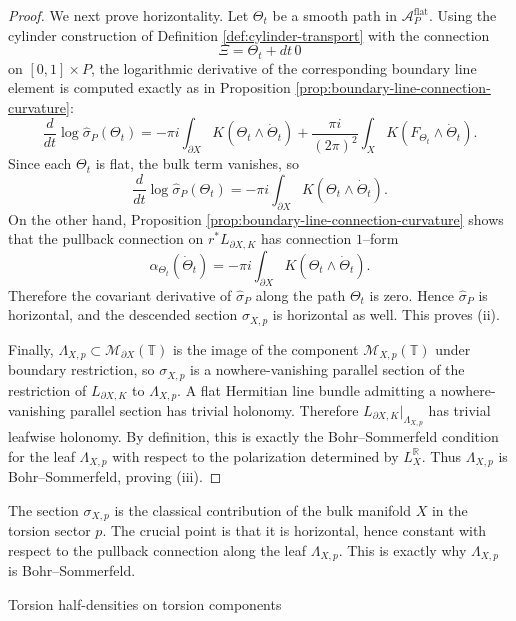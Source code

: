 \documentclass[12pt]{amsart}
\makeatletter
\renewcommand\subsection{\@startsection{subsection}{2}%
  \z@{.5\linespacing\@plus.7\linespacing}{-.5em}%
  {\normalfont\bfseries}}
\numberwithin{equation}{section}
\makeatother
\begin{document}
\begin{proof}
We next prove horizontality. Let $\Theta_t$ be a smooth path in
$\mathcal A^{\mathrm{flat}}_P$. Using the cylinder construction of Definition \ref{def:cylinder-transport} with the
connection
\[
\Xi=\Theta_t+dt\,0
\]
on $[0,1]\times P$, the logarithmic derivative of the corresponding boundary line element is
computed exactly as in Proposition \ref{prop:boundary-line-connection-curvature}:
\[
\frac{d}{dt}\log \widehat{\sigma}_P(\Theta_t)
=
-\pi i\int_{\partial X} K(\Theta_t\wedge \dot\Theta_t)
+\frac{\pi i}{(2\pi)^2}\int_X K(F_{\Theta_t}\wedge \dot\Theta_t).
\]
Since each $\Theta_t$ is flat, the bulk term vanishes, so
\[
\frac{d}{dt}\log \widehat{\sigma}_P(\Theta_t)
=
-\pi i\int_{\partial X} K(\Theta_t\wedge \dot\Theta_t).
\]
On the other hand, Proposition \ref{prop:boundary-line-connection-curvature} shows that the pullback connection on
$r^*L_{\partial X,K}$ has connection $1$--form
\[
\alpha_{\Theta_t}(\dot\Theta_t)
=
-\pi i\int_{\partial X} K(\Theta_t\wedge \dot\Theta_t).
\]
Therefore the covariant derivative of $\widehat{\sigma}_P$ along the path $\Theta_t$ is zero.
Hence $\widehat{\sigma}_P$ is horizontal, and the descended section $\sigma_{X,p}$ is horizontal
as well. This proves (ii).

Finally, $\Lambda_{X,p}\subset \mathcal M_{\partial X}(\mathbb T)$ is the image of the component
$\mathcal M_{X,p}(\mathbb T)$ under boundary restriction, so $\sigma_{X,p}$ is a nowhere-vanishing
parallel section of the restriction of $L_{\partial X,K}$ to $\Lambda_{X,p}$. A flat Hermitian line
bundle admitting a nowhere-vanishing parallel section has trivial holonomy. Therefore $L_{\partial X,K}|_{\Lambda_{X,p}}$ has trivial leafwise holonomy. By definition, this is exactly the Bohr--Sommerfeld condition for
the leaf $\Lambda_{X,p}$ with respect to the polarization determined by
$L_X^{\mathbb R}$. Thus $\Lambda_{X,p}$ is Bohr--Sommerfeld, proving (iii).
\end{proof}

The section \(\sigma_{X,p}\) is the classical contribution of the bulk manifold \(X\) in the torsion sector \(p\). The crucial point is that it is horizontal, hence constant with respect to the pullback connection along the leaf \(\Lambda_{X,p}\). This is exactly why \(\Lambda_{X,p}\) is Bohr--Sommerfeld.

\subsection{Torsion half-densities on torsion components}
\end{document}
